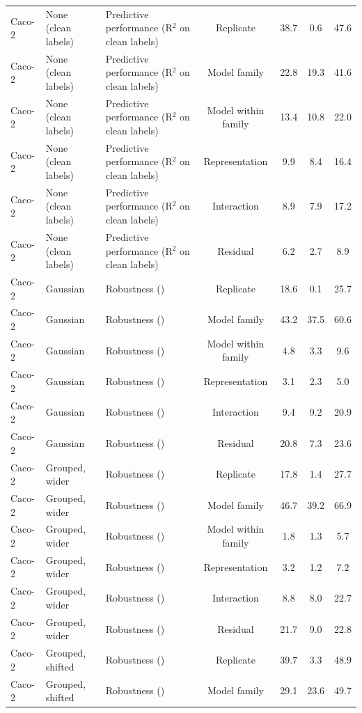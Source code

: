 \begin{landscape}
{\begin{longtable}{lllcccc}
Caco-2 & None (clean labels) & Predictive performance (R$^2$ on clean labels) & Replicate & 38.7 & 0.6 & 47.6 \\
Caco-2 & None (clean labels) & Predictive performance (R$^2$ on clean labels) & Model family & 22.8 & 19.3 & 41.6 \\
Caco-2 & None (clean labels) & Predictive performance (R$^2$ on clean labels) & Model within family & 13.4 & 10.8 & 22.0 \\
Caco-2 & None (clean labels) & Predictive performance (R$^2$ on clean labels) & Representation & 9.9 & 8.4 & 16.4 \\
Caco-2 & None (clean labels) & Predictive performance (R$^2$ on clean labels) & Interaction & 8.9 & 7.9 & 17.2 \\
Caco-2 & None (clean labels) & Predictive performance (R$^2$ on clean labels) & Residual & 6.2 & 2.7 & 8.9 \\
Caco-2 & Gaussian & Robustness (\aucnorm{}) & Replicate & 18.6 & 0.1 & 25.7 \\
Caco-2 & Gaussian & Robustness (\aucnorm{}) & Model family & 43.2 & 37.5 & 60.6 \\
Caco-2 & Gaussian & Robustness (\aucnorm{}) & Model within family & 4.8 & 3.3 & 9.6 \\
Caco-2 & Gaussian & Robustness (\aucnorm{}) & Representation & 3.1 & 2.3 & 5.0 \\
Caco-2 & Gaussian & Robustness (\aucnorm{}) & Interaction & 9.4 & 9.2 & 20.9 \\
Caco-2 & Gaussian & Robustness (\aucnorm{}) & Residual & 20.8 & 7.3 & 23.6 \\
Caco-2 & Grouped, wider & Robustness (\aucnorm{}) & Replicate & 17.8 & 1.4 & 27.7 \\
Caco-2 & Grouped, wider & Robustness (\aucnorm{}) & Model family & 46.7 & 39.2 & 66.9 \\
Caco-2 & Grouped, wider & Robustness (\aucnorm{}) & Model within family & 1.8 & 1.3 & 5.7 \\
Caco-2 & Grouped, wider & Robustness (\aucnorm{}) & Representation & 3.2 & 1.2 & 7.2 \\
Caco-2 & Grouped, wider & Robustness (\aucnorm{}) & Interaction & 8.8 & 8.0 & 22.7 \\
Caco-2 & Grouped, wider & Robustness (\aucnorm{}) & Residual & 21.7 & 9.0 & 22.8 \\
Caco-2 & Grouped, shifted & Robustness (\aucnorm{}) & Replicate & 39.7 & 3.3 & 48.9 \\
Caco-2 & Grouped, shifted & Robustness (\aucnorm{}) & Model family & 29.1 & 23.6 & 49.7 \\

\end{longtable}}
\end{landscape}
